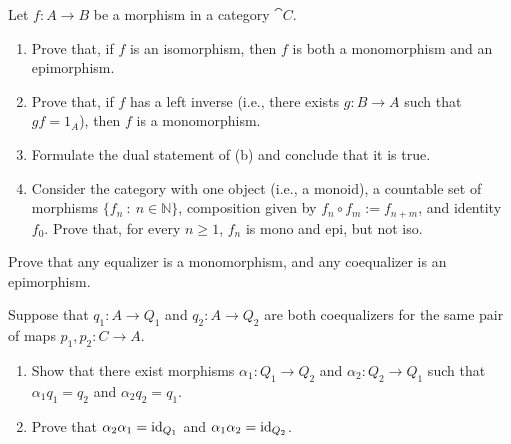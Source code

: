 \begin{exercise}\label{exe:monoepiiso}
Let $f \colon A \to B$ be a morphism in a category $\cat{C}$.
\begin{enumerate}
\item Prove that, if $f$ is an isomorphism, then $f$ is both a monomorphism and an epimorphism.
\item Prove that, if $f$ has a left inverse (i.e., there exists $g \colon B \to A$ such that $gf = 1_A$), then $f$ is a monomorphism.
\item Formulate the dual statement of (b) and conclude that it is true.
\item Consider the category with one object (i.e., a monoid), a countable set of morphisms $\{f_n \ : \ n \in \mathbb{N}\}$, composition given by $f_n \circ f_m := f_{n + m}$, and identity $f_0$. Prove that, for every $n \geq 1$, $f_n$ is mono and epi, but not iso.
\end{enumerate}
\end{exercise}




\begin{exercise}\label{exe:coequalizers}
Prove that any equalizer is a monomorphism, and any coequalizer is an epimorphism.
\end{exercise}
\begin{exercise}\label{exe:coequalizers-unique}
Suppose that $q_1 \colon A \to Q_1$ and $q_2 \colon A \to Q_2$ are both coequalizers for the same pair of maps $p_1, p_2 \colon C \to A$.\
\begin{enumerate}
\item Show that there exist morphisms $\alpha_1 \colon Q_1 \to Q_2$ and $\alpha_2 \colon Q_2 \to Q_1$ such that $\alpha_1q_1 = q_2$ and $\alpha_2 q_2 = q_1$.
\item Prove that $\alpha_2\alpha_1 = \mathrm{id}_{Q_1}$ and $\alpha_1\alpha_2 = \mathrm{id}_{Q_2}$.

\end{enumerate}

\end{exercise}

